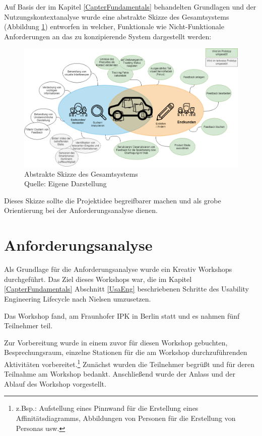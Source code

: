 Auf Basis der im Kapitel \ref{CapterFundamentals} behandelten Grundlagen und der Nutzungskontextanalyse wurde eine abstrakte Skizze des Gesamtsystems (Abbildung \ref{img:sysstem_sketch}) entworfen in welcher, 
Funktionale wie Nicht-Funktionale Anforderungen an das zu konzipierende System dargestellt werden:

\begin{figure}[H]
	\centering
	\includegraphics[width=1.0\textwidth]{resources/conception/SystemSkizze.png}
	\caption{Abstrakte Skizze des Gesamtsystems \\Quelle: Eigene Darstellung}
	\label{img:sysstem_sketch}
\end{figure}

Dieses Skizze sollte die Projektidee begreifbarer machen und als grobe Orientierung bei der Anforderungsanalyse dienen.

\section{Anforderungsanalyse}\label{anforderungsanalyse}

Als Grundlage für die Anforderungsanalyse wurde ein Kreativ Workshops durchgeführt. Das Ziel dieses Workshops war, die im Kapitel \ref{CapterFundamentals} Abschnitt \ref{UsaEng} beschriebenen Schritte des Usability Engineering Lifecycle nach Nielsen umzusetzen.   

Das Workshop fand, am Fraunhofer IPK in Berlin statt und es nahmen fünf Teilnehmer teil. %

Zur Vorbereitung wurde in einem zuvor für diesen Workshop gebuchten, Besprechungsraum, einzelne Stationen für die am Workshop durchzuführenden Aktivitäten vorbereitet.\footnote{z.Bsp.: Aufstellung eines Pinnwand für die Erstellung eines Affinitätsdiagramms, Abbildungen von Personen für die Erstellung von Personas usw.} Zunächst wurden die Teilnehmer begrüßt und für deren Teilnahme am Workshop bedankt. 
Anschließend wurde der Anlass und der Ablauf des Workshop vorgestellt. 

